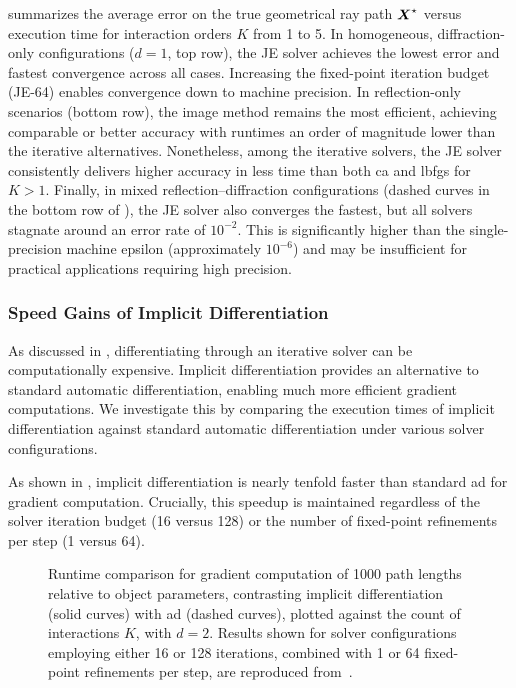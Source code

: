  summarizes the average error on the true geometrical ray path $\boldsymbol{X}^\star$ versus execution time for interaction orders $K$ from 1 to 5. In homogeneous, diffraction-only configurations ($d=1$, top row), the JE solver achieves the lowest error and fastest convergence across all cases. Increasing the fixed-point iteration budget (JE-64) enables convergence down to machine precision. In reflection-only scenarios (bottom row), the image method remains the most efficient, achieving comparable or better accuracy with runtimes an order of magnitude lower than the iterative alternatives. Nonetheless, among the iterative solvers, the JE solver consistently delivers higher accuracy in less time than both \gls{ca} and \gls{lbfgs} for $K > 1$. Finally, in mixed reflection--diffraction configurations (dashed curves in the bottom row of ), the JE solver also converges the fastest, but all solvers stagnate around an error rate of $10^{-2}$. This is significantly higher than the single-precision machine epsilon (approximately $10^{-6}$) and may be insufficient for practical applications requiring high precision.

\subsubsection{Speed Gains of Implicit Differentiation}

As discussed in , differentiating through an iterative solver can be computationally expensive. Implicit differentiation provides an alternative to standard automatic differentiation, enabling much more efficient gradient computations. We investigate this by comparing the execution times of implicit differentiation against standard automatic differentiation under various solver configurations.

As shown in , implicit differentiation is nearly tenfold faster than standard \gls{ad} for gradient computation. Crucially, this speedup is maintained regardless of the solver iteration budget (16 versus 128) or the number of fixed-point refinements per step (1 versus 64).

\begin{figure}[h]
  \centering
  \caption{Runtime comparison for gradient computation of 1000 path lengths relative to object parameters, contrasting implicit differentiation (solid curves) with \gls{ad} (dashed curves), plotted against the count of interactions $K$, with $d=2$. Results shown for solver configurations employing either 16 or 128 iterations, combined with 1 or 64 fixed-point refinements per step, are reproduced from~\cite[Fig.~3]{Eertmans2026EuCAP}.}
\end{figure}

